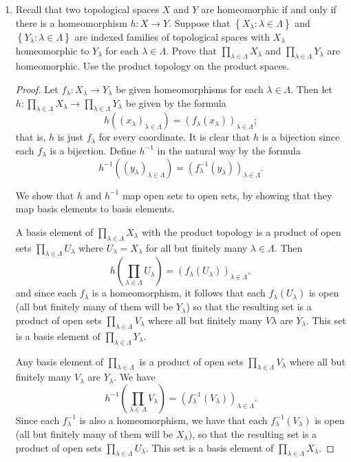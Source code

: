 \documentclass[11pt]{article}
\newcommand{\br}[1]{\left(#1\right)}
\newcommand{\cbr}[1]{\left\{#1\right\}}
\begin{document}
\begin{enumerate}
\begin{enumerate}[label=(\alph*)]
\begin{proof}
        Hence $x_n$ does not converge.
      \end{proof}
    \end{enumerate}
    \item Recall that two topological spaces $X$ and $Y$ are homeomorphic if and only if there is a homeomorphism $h\colon X\to Y$. Suppose that $\cbr{X_\lambda\colon \lambda \in \Lambda}$ and $\cbr{Y_{\lambda}\colon \lambda \in \Lambda}$ are indexed families of topological spaces with $X_\lambda$ homeomorphic to $Y_\lambda$ for each $\lambda \in \Lambda$. Prove that $\prod_{\lambda\in\Lambda}X_\lambda$ and $\prod_{\lambda\in\Lambda}Y_{\lambda}$ are homeomorphic. Use the product topology on the product spaces.
    \begin{proof}
      Let $f_{\lambda}\colon X_\lambda \to Y_\lambda$ be given homeomorphisms for each $\lambda\in\Lambda$. Then let $h\colon \prod_{\lambda\in\Lambda}X_\lambda\to \prod_{\lambda\in\Lambda}Y_{\lambda}$ be given by the formula \[h((x_\lambda)_{\lambda\in\Lambda}) = (f_\lambda(x_\lambda))_{\lambda\in\Lambda};\] that is, $h$ is just $f_\lambda$ for every coordinate. It is clear that $h$ is a bijection since each $f_\lambda$ is a bijection. Define $h^{-1}$ in the natural way by the formula \[h^{-1}((y_\lambda)_{\lambda\in\Lambda}) = (f_\lambda^{-1}(y_\lambda))_{\lambda\in\Lambda}.\]

      We show that $h$ and $h^{-1}$ map open sets to open sets, by showing that they map basis elements to basis elements.

      A basis element of $\prod_{\lambda\in\Lambda}X_\lambda$ with the product topology is a product of open sets $\prod_{\lambda\in\Lambda}U_\lambda$ where $U_\lambda = X_\lambda$ for all but finitely many $\lambda\in\Lambda$. Then \[h\br{\prod_{\lambda\in\Lambda}U_\lambda} = (f_\lambda(U_\lambda))_{\lambda\in\Lambda},\] and since each $f_\lambda$ is a homeomorphism, it follows that each $f_\lambda(U_\lambda)$ is open (all but finitely many of them will be $Y_\lambda$) so that the resulting set is a product of open sets $\prod_{\lambda\in\Lambda} V_\lambda$ where all but finitely many $V\lambda$ are $Y_\lambda$. This set is a basis element of $\prod_{\lambda\in\Lambda}Y_\lambda$.

      Any basis element of $\prod_{\lambda\in\Lambda}$ is a product of open sets $\prod_{\lambda\in\Lambda} V_\lambda$ where all but finitely many $V_\lambda$ are $Y_\lambda$. We have \[h^{-1}\br{\prod_{\lambda\in\Lambda} V_\lambda} = (f_\lambda^{-1}(V_\lambda))_{\lambda\in\Lambda}.\] Since each $f_\lambda^{-1}$ is also a homeomorphism, we have that each $f_\lambda^{-1}(V_\lambda)$ is open (all but finitely many of them will be $X_\lambda$), so that the resulting set is a product of open sets $\prod_{\lambda\in\Lambda}U_\lambda$. This set is a basis element of $\prod_{\lambda\in\Lambda}X_\lambda$.


\end{proof}
\end{enumerate}
\end{document}
